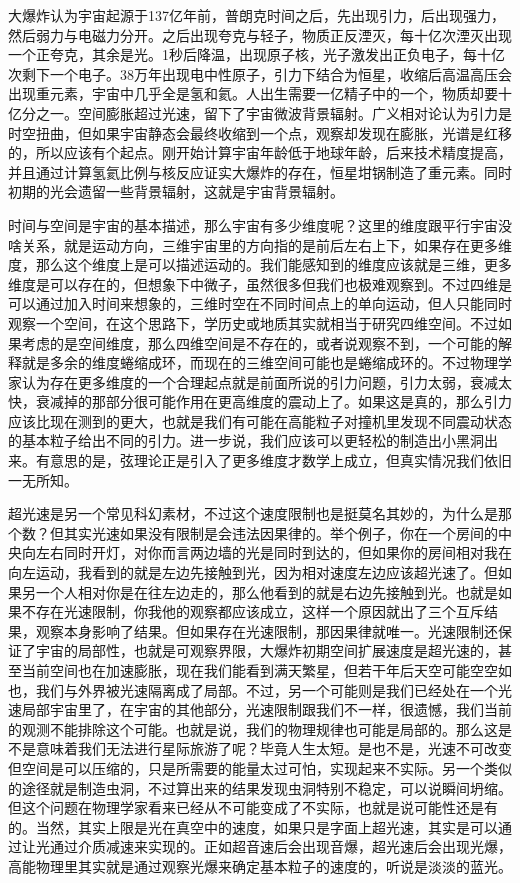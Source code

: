 \documentclass[]{book}
\begin{document}
大爆炸认为宇宙起源于137亿年前，普朗克时间之后，先出现引力，后出现强力，然后弱力与电磁力分开。之后出现夸克与轻子，物质正反湮灭，每十亿次湮灭出现一个正夸克，其余是光。1秒后降温，出现原子核，光子激发出正负电子，每十亿次剩下一个电子。38万年出现电中性原子，引力下结合为恒星，收缩后高温高压会出现重元素，宇宙中几乎全是氢和氦。人出生需要一亿精子中的一个，物质却要十亿分之一。空间膨胀超过光速，留下了宇宙微波背景辐射。广义相对论认为引力是时空扭曲，但如果宇宙静态会最终收缩到一个点，观察却发现在膨胀，光谱是红移的，所以应该有个起点。刚开始计算宇宙年龄低于地球年龄，后来技术精度提高，并且通过计算氢氦比例与核反应证实大爆炸的存在，恒星坩锅制造了重元素。同时初期的光会遗留一些背景辐射，这就是宇宙背景辐射。

时间与空间是宇宙的基本描述，那么宇宙有多少维度呢？这里的维度跟平行宇宙没啥关系，就是运动方向，三维宇宙里的方向指的是前后左右上下，如果存在更多维度，那么这个维度上是可以描述运动的。我们能感知到的维度应该就是三维，更多维度是可以存在的，但想象下中微子，虽然很多但我们也极难观察到。不过四维是可以通过加入时间来想象的，三维时空在不同时间点上的单向运动，但人只能同时观察一个空间，在这个思路下，学历史或地质其实就相当于研究四维空间。不过如果考虑的是空间维度，那么四维空间是不存在的，或者说观察不到，一个可能的解释就是多余的维度蜷缩成环，而现在的三维空间可能也是蜷缩成环的。不过物理学家认为存在更多维度的一个合理起点就是前面所说的引力问题，引力太弱，衰减太快，衰减掉的那部分很可能作用在更高维度的震动上了。如果这是真的，那么引力应该比现在测到的更大，也就是我们有可能在高能粒子对撞机里发现不同震动状态的基本粒子给出不同的引力。进一步说，我们应该可以更轻松的制造出小黑洞出来。有意思的是，弦理论正是引入了更多维度才数学上成立，但真实情况我们依旧一无所知。

超光速是另一个常见科幻素材，不过这个速度限制也是挺莫名其妙的，为什么是那个数？但其实光速如果没有限制是会违法因果律的。举个例子，你在一个房间的中央向左右同时开灯，对你而言两边墙的光是同时到达的，但如果你的房间相对我在向左运动，我看到的就是左边先接触到光，因为相对速度左边应该超光速了。但如果另一个人相对你是在往左边走的，那么他看到的就是右边先接触到光。也就是如果不存在光速限制，你我他的观察都应该成立，这样一个原因就出了三个互斥结果，观察本身影响了结果。但如果存在光速限制，那因果律就唯一。光速限制还保证了宇宙的局部性，也就是可观察界限，大爆炸初期空间扩展速度是超光速的，甚至当前空间也在加速膨胀，现在我们能看到满天繁星，但若干年后天空可能空空如也，我们与外界被光速隔离成了局部。不过，另一个可能则是我们已经处在一个光速局部宇宙里了，在宇宙的其他部分，光速限制跟我们不一样，很遗憾，我们当前的观测不能排除这个可能。也就是说，我们的物理规律也可能是局部的。那么这是不是意味着我们无法进行星际旅游了呢？毕竟人生太短。是也不是，光速不可改变但空间是可以压缩的，只是所需要的能量太过可怕，实现起来不实际。另一个类似的途径就是制造虫洞，不过算出来的结果发现虫洞特别不稳定，可以说瞬间坍缩。但这个问题在物理学家看来已经从不可能变成了不实际，也就是说可能性还是有的。当然，其实上限是光在真空中的速度，如果只是字面上超光速，其实是可以通过让光通过介质减速来实现的。正如超音速后会出现音爆，超光速后会出现光爆，高能物理里其实就是通过观察光爆来确定基本粒子的速度的，听说是淡淡的蓝光。
\end{document}
